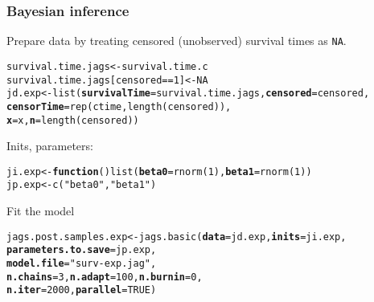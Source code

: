 \documentclass[color=usenames,dvipsnames]{beamer}\usepackage[]{graphicx}\usepackage[]{xcolor}
\makeatletter
\newcommand{\hlnum}[1]{\textcolor[rgb]{0.69,0.494,0}{#1}}%
\newcommand{\hlsng}[1]{\textcolor[rgb]{0.749,0.012,0.012}{#1}}%
\newcommand{\hlopt}[1]{\textcolor[rgb]{0,0,0}{#1}}%
\newcommand{\hldef}[1]{\textcolor[rgb]{0,0,0}{#1}}%
\newcommand{\hlkwa}[1]{\textcolor[rgb]{0,0,0}{\textbf{#1}}}%
\newcommand{\hlkwb}[1]{\textcolor[rgb]{0,0.341,0.682}{#1}}%
\newcommand{\hlkwc}[1]{\textcolor[rgb]{0,0,0}{\textbf{#1}}}%
\newcommand{\hlkwd}[1]{\textcolor[rgb]{0.004,0.004,0.506}{#1}}%
\newenvironment{kframe}{%
 \def\at@end@of@kframe{}%
 \ifinner\ifhmode%
  \def\at@end@of@kframe{\end{minipage}}%
  \begin{minipage}{\columnwidth}%
 \fi\fi%
 \def\FrameCommand##1{\hskip\@totalleftmargin \hskip-\fboxsep
 \colorbox{shadecolor}{##1}\hskip-\fboxsep
     \hskip-\linewidth \hskip-\@totalleftmargin \hskip\columnwidth}%
 \MakeFramed {\advance\hsize-\width
   \@totalleftmargin\z@ \linewidth\hsize
   \@setminipage}}%
 {\par\unskip\endMakeFramed%
 \at@end@of@kframe}
\newenvironment{knitrout}{}{} %
\let\hlstd\hldef
\let\hlstr\hlsng
\newcommand{\inr}[1]{\colorbox{inlinecolor}{\texttt{#1}}}
\makeatother
\begin{document}
\begin{frame}[fragile]
  \frametitle{Bayesian inference}
  Prepare data by treating censored (unobserved) survival times as
  \inr{NA}. 
\begin{knitrout}\scriptsize
{}\color{fgcolor}\begin{kframe}
\begin{alltt}
\hldef{survival.time.jags} \hlkwb{<-} \hldef{survival.time.c}
\hldef{survival.time.jags[censored}\hlopt{==}\hlnum{1}\hldef{]} \hlkwb{<-} \hlnum{NA}
\hldef{jd.exp} \hlkwb{<-} \hlkwd{list}\hldef{(}\hlkwc{survivalTime}\hldef{=survival.time.jags,} \hlkwc{censored}\hldef{=censored,}
               \hlkwc{censorTime}\hldef{=}\hlkwd{rep}\hldef{(ctime,} \hlkwd{length}\hldef{(censored)),}
               \hlkwc{x}\hldef{=x,} \hlkwc{n}\hldef{=}\hlkwd{length}\hldef{(censored))}
\end{alltt}
\end{kframe}
\end{knitrout}
\pause
\vfill
  Inits, parameters:
\begin{knitrout}\scriptsize
{}\color{fgcolor}\begin{kframe}
\begin{alltt}
\hldef{ji.exp} \hlkwb{<-} \hlkwa{function}\hldef{()} \hlkwd{list}\hldef{(}\hlkwc{beta0}\hldef{=}\hlkwd{rnorm}\hldef{(}\hlnum{1}\hldef{),} \hlkwc{beta1}\hldef{=}\hlkwd{rnorm}\hldef{(}\hlnum{1}\hldef{))}
\hldef{jp.exp} \hlkwb{<-} \hlkwd{c}\hldef{(}\hlsng{"beta0"}\hldef{,} \hlsng{"beta1"}\hldef{)}
\end{alltt}
\end{kframe}
\end{knitrout}
\pause
\vfill
  {\normalsize Fit the model}
\begin{knitrout}\scriptsize
{}\color{fgcolor}\begin{kframe}
\begin{alltt}
\hlstd{jags.post.samples.exp} \hlkwb{<-} \hlkwd{jags.basic}\hlstd{(}\hlkwc{data}\hlstd{=jd.exp,} \hlkwc{inits}\hlstd{=ji.exp,}
                                    \hlkwc{parameters.to.save}\hlstd{=jp.exp,}
                                    \hlkwc{model.file}\hlstd{=}\hlstr{"surv-exp.jag"}\hlstd{,}
                                    \hlkwc{n.chains}\hlstd{=}\hlnum{3}\hlstd{,} \hlkwc{n.adapt}\hlstd{=}\hlnum{100}\hlstd{,} \hlkwc{n.burnin}\hlstd{=}\hlnum{0}\hlstd{,}
                                    \hlkwc{n.iter}\hlstd{=}\hlnum{2000}\hlstd{,} \hlkwc{parallel}\hlstd{=}\hlnum{TRUE}\hlstd{)}
\end{alltt}
\end{kframe}
\end{knitrout}
\end{frame}
\end{document}
